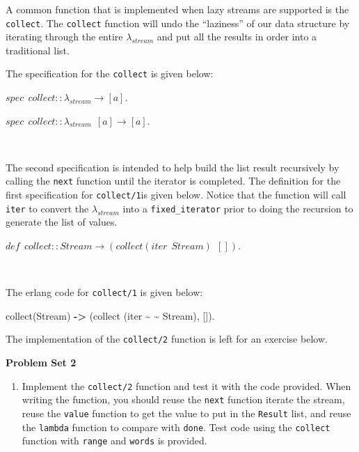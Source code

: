 \documentclass[
]{book}
\newenvironment{Shaded}{\begin{snugshade}}{\end{snugshade}}
\newcommand{\CharTok}[1]{\textcolor[rgb]{0.31,0.60,0.02}{#1}}
\newcommand{\FunctionTok}[1]{\textcolor[rgb]{0.00,0.00,0.00}{#1}}
\newcommand{\NormalTok}[1]{#1}
\newcommand{\OperatorTok}[1]{\textcolor[rgb]{0.81,0.36,0.00}{\textbf{#1}}}
\newcommand{\VariableTok}[1]{\textcolor[rgb]{0.00,0.00,0.00}{#1}}
\providecommand{\tightlist}{%
  \setlength{\itemsep}{0pt}\setlength{\parskip}{0pt}}
\begin{document}
A common function that is implemented when lazy streams are supported is the \texttt{collect}. The \texttt{collect} function will undo the ``laziness'' of our data structure by iterating through the entire \(\lambda_{stream}\) and put all the results in order into a traditional list.

The specification for the \texttt{collect} is given below:

\begin{formulabox}
\(spec ~ ~ collect :: \lambda_{stream} \rightarrow [a].\)

\(spec ~ ~ collect :: \lambda_{stream} ~ ~ [a] \rightarrow [a].\)

\end{formulabox}

\(\nonumber\)

The second specification is intended to help build the list result recursively by calling the \texttt{next} function until the iterator is completed. The definition for the first specification for \texttt{collect/1}is given below. Notice that the function will call \texttt{iter} to convert the \(\lambda_{stream}\) into a \texttt{fixed\_iterator} prior to doing the recursion to generate the list of values.

\begin{formulabox}
\(de\mathit{f} ~ ~ collect :: Stream \rightarrow (collect (iter ~ ~ Stream) ~ ~ []).\)

\end{formulabox}

\(\nonumber\)

The erlang code for \texttt{collect/1} is given below:

\begin{Shaded}
\begin{Highlighting}[]
\FunctionTok{collect(}\VariableTok{Stream}\FunctionTok{)} \OperatorTok{{-}\textgreater{}} \FunctionTok{(}\CharTok{collect} \FunctionTok{(}\CharTok{iter}\NormalTok{ \textasciitilde{} \textasciitilde{} }\VariableTok{Stream}\FunctionTok{),} \FunctionTok{[]).}
\end{Highlighting}
\end{Shaded}

The implementation of the \texttt{collect/2} function is left for an exercise below.

\begin{problembox}

\textbf{Problem Set 2}

\begin{enumerate}
\def\labelenumi{\arabic{enumi}.}
\tightlist
\item
  Implement the \texttt{collect/2} function and test it with the code provided. When writing the function, you should reuse the \texttt{next} function iterate the stream, reuse the \texttt{value} function to get the value to put in the \texttt{Result} list, and reuse the \texttt{lambda} function to compare with \texttt{done}. Test code using the \texttt{collect} function with \texttt{range} and \texttt{words} is provided.
\end{enumerate}

\end{problembox}
\end{document}
